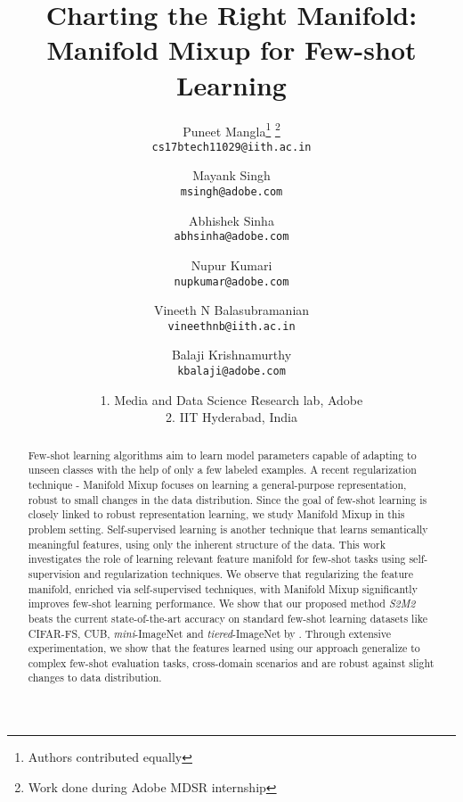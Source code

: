 \documentclass[10pt,twocolumn,letterpaper]{article}
\begin{document}
\title{Charting the Right Manifold: Manifold Mixup for Few-shot Learning
}

\author{Puneet Mangla\thanks{Authors contributed equally   }   \thanks{Work done during Adobe MDSR internship }   \\
{\tt\small cs17btech11029@iith.ac.in}
\and
Mayank Singh \\
{\tt\small msingh@adobe.com}
\and
Abhishek Sinha \\
{\tt\small abhsinha@adobe.com}
\and
Nupur Kumari \\
{\tt\small nupkumar@adobe.com}
\and
Vineeth N Balasubramanian \\
{\tt\small vineethnb@iith.ac.in}
\and
Balaji Krishnamurthy \\
{\tt\small kbalaji@adobe.com}\\
\and
1. Media and Data Science Research lab, Adobe\\
2. IIT Hyderabad, India
}


\maketitle
\ifwacvfinal\thispagestyle{empty}\fi

\begin{abstract}

Few-shot learning algorithms aim to learn model parameters capable of adapting to unseen classes with the help of only a few labeled examples. A recent regularization technique - Manifold Mixup focuses on learning a general-purpose representation, robust to small changes in the data distribution. Since the goal of few-shot learning is closely linked to robust representation learning, we study Manifold Mixup in this problem setting. Self-supervised learning is another technique that learns semantically meaningful features, using only the inherent structure of the data. This work investigates the role of learning relevant feature manifold for few-shot tasks using self-supervision and regularization techniques. We observe that regularizing the feature manifold, enriched via self-supervised techniques, with Manifold Mixup significantly improves few-shot learning performance.  
We show that our proposed method \textit{S2M2} beats the current state-of-the-art accuracy on standard few-shot learning datasets like CIFAR-FS, CUB, \textit{mini}-ImageNet and {\textit{tiered}-ImageNet} by . Through extensive experimentation, we show that the features learned using our approach generalize to complex few-shot evaluation tasks, cross-domain scenarios and are robust against slight changes to data distribution.
\end{abstract}
\end{document}
